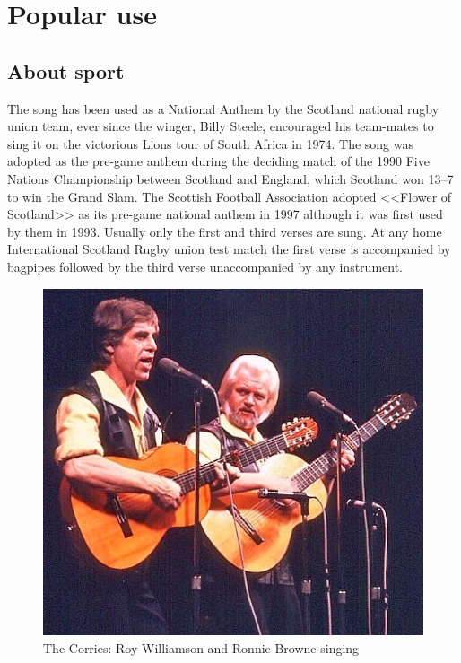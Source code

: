 \documentclass[a4paper,12pt]{article}
\begin{document}
\section{Popular use}

\subsection{About sport}

The song has been used as a National Anthem by the Scotland national rugby union team, ever since the winger, Billy Steele, encouraged his team-mates to sing it on the victorious Lions tour of South Africa in 1974. The song was adopted as the pre-game anthem during the deciding match of the 1990 Five Nations Championship between Scotland and England, which Scotland won 13–7 to win the Grand Slam. The Scottish Football Association adopted <<Flower of Scotland>> as its pre-game national anthem in 1997 although it was first used by them in 1993. Usually only the first and third verses are sung. At any home International Scotland Rugby union test match the first verse is accompanied by bagpipes followed by the third verse unaccompanied by any instrument.
\begin{figure}
	\includegraphics[width=\linewidth]{both}
	\caption{The Corries: Roy Williamson and Ronnie Browne singing}
\end{figure}
\end{document}
